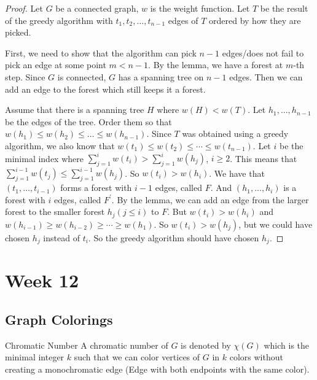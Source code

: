 \documentclass{report}
\begin{document}
\begin{proof}
    Let $G$ be a connected graph, $w$ is the weight function. Let $T$ be the result of the greedy algorithm with $t_{1}, t_{2}, \ldots, t_{n - 1}$ edges of $T$ ordered by how they are picked. 

    First, we need to show that the algorithm can pick $n - 1$ edges/does not fail to pick an edge at some point $m < n - 1$. By the lemma, we have a forest at $m$-th step. Since $G$ is connected, $G$ has a spanning tree on $n - 1$ edges. Then we can add an edge to the forest which still keeps it a forest. 

    Assume that there is a spanning tree $H$ where $w(H) < w(T)$. Let $h_{1}, \ldots, h_{n - 1}$ be the edges of the tree. Order them so that $w(h_{1}) \leq w(h_{2}) \leq \ldots \leq w(h_{n - 1})$. Since $T$ was obtained using a greedy algorithm, we also know that $w(t_{1}) \leq w(t_{2}) \leq \cdots \leq w(t_{n - 1})$. Let $i$ be the minimal index where $\sum_{j = 1}^{i}w(t_{i}) > \sum_{j = 1}^{i}w(h_{j})$, $i \geq 2$. This means that $\sum_{j = 1}^{i - 1}w(t_{j}) \leq \sum_{j = 1}^{i -1}w(h_{j})$. So $w(t_{i}) > w(h_{i})$. We have that $(t_{1}, \ldots, t_{i - 1})$ forms a forest with $i - 1$ edges, called $F$. And $(h_{1}, \ldots, h_{i})$ is a forest with $i$ edges, called $F^{\prime}$. By the lemma, we can add an edge from the larger forest to the smaller forest $h_{j} (j \leq i)$ to $F$. But $w(t_{i}) > w(h_{i})$ and $w(h_{i - 1}) \geq w(h_{i - 2}) \geq \cdots \geq w(h_{1})$. So $w(t_{i}) > w(h_{j})$, but we could have chosen $h_{j}$ instead of $t_{i}$. So the greedy algorithm should have chosen $h_{j}$.
\end{proof}

\chapter{Week 12}

\begin{topic}
    \section{Graph Colorings}
\end{topic}

\begin{definition}{Chromatic Number}
    A chromatic number of $G$ is denoted by $ \chi (G)$ which is the minimal integer $k$ such that we can color vertices of $G$ in $k$ colors without creating a monochromatic edge (Edge with both endpoints with the same color).
\end{definition}
\end{document}
